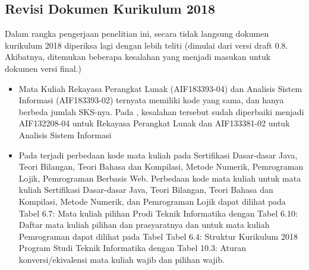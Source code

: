 \subsection{Revisi Dokumen Kurikulum 2018}
\label{subbab:revisidokumenkurikulum2018}

Dalam rangka pengerjaan penelitian ini, secara tidak langsung dokumen kurikulum 2018 diperiksa lagi dengan lebih teliti (dimulai dari versi draft 0.8. Akibatnya, ditemukan beberapa kesalahan yang menjadi masukan untuk dokumen versi final.)
\begin{itemize}
	\item Mata Kuliah Rekayasa Perangkat Lunak (AIF183393-04) dan Analisis Sistem Informasi (AIF183393-02) ternyata memiliki kode yang sama, dan hanya berbeda jumlah SKS-nya. Pada \cite{dokumenkurikulum2018}, kesalahan tersebut sudah diperbaiki menjadi AIF132208-04 untuk Rekayasa Perangkat Lunak dan AIF133381-02 untuk Analisis Sistem Informasi
	\item Pada \cite{dokumenkurikulum2018} terjadi perbedaan kode mata kuliah pada Sertifikasi Dasar-dasar Java, Teori Bilangan, Teori Bahasa dan Kompilasi, Metode Numerik, Pemrograman Lojik, Pemrograman Berbasis Web. Perbedaan kode mata kuliah untuk mata kuliah Sertifikasi Dasar-dasar Java, Teori Bilangan, Teori Bahasa dan Kompilasi, Metode Numerik, dan Pemrograman Lojik dapat dilihat pada \cite{dokumenkurikulum2018} Tabel 6.7: Mata kuliah pilihan Prodi Teknik Informatika dengan Tabel 6.10: Daftar mata kuliah pilihan dan prasyaratnya dan untuk mata kuliah Pemrograman dapat dilihat pada \cite{dokumenkurikulum2018} Tabel Tabel 6.4: Struktur Kurikulum 2018 Program Studi Teknik Informatika dengan Tabel 10.3: Aturan konversi/ekivalensi mata kuliah wajib dan pilihan wajib. 
\end{itemize}